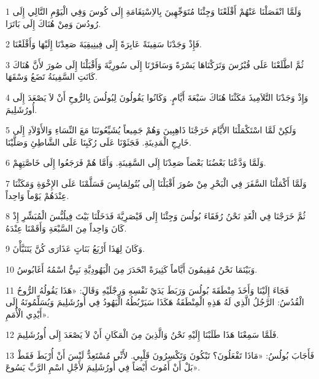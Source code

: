 \par 1 وَلَمَّا انْفَصَلْنَا عَنْهُمْ أَقْلَعْنَا وَجِئْنَا مُتَوَجِّهِينَ بِالاِسْتِقَامَةِ إِلَى كُوسَ وَفِي الْيَوْمِ التَّالِي إِلَى رُودُسَ وَمِنْ هُنَاكَ إِلَى بَاتَرَا.
\par 2 فَإِذْ وَجَدْنَا سَفِينَةً عَابِرَةً إِلَى فِينِيقِيَةَ صَعِدْنَا إِلَيْهَا وَأَقْلَعْنَا.
\par 3 ثُمَّ اطَّلَعْنَا عَلَى قُبْرُسَ وَتَرَكْنَاهَا يَسْرَةً وَسَافَرْنَا إِلَى سُورِيَّةَ وَأَقْبَلْنَا إِلَى صُورَ لأَنَّ هُنَاكَ كَانَتِ السَّفِينَةُ تَضَعُ وَسْقَهَا.
\par 4 وَإِذْ وَجَدْنَا التَّلاَمِيذَ مَكَثْنَا هُنَاكَ سَبْعَةَ أَيَّامٍ. وَكَانُوا يَقُولُونَ لِبُولُسَ بِالرُّوحِ أَنْ لاَ يَصْعَدَ إِلَى أُورُشَلِيمَ.
\par 5 وَلَكِنْ لَمَّا اسْتَكْمَلْنَا الأَيَّامَ خَرَجْنَا ذَاهِبِينَ وَهُمْ جَمِيعاً يُشَيِّعُونَنَا مَعَ النِّسَاءِ وَالأَوْلاَدِ إِلَى خَارِجِ الْمَدِينَةِ. فَجَثَوْنَا عَلَى رُكَبِنَا عَلَى الشَّاطِئِ وَصَلَّيْنَا.
\par 6 وَلَمَّا وَدَّعْنَا بَعْضُنَا بَعْضاً صَعِدْنَا إِلَى السَّفِينَةِ. وَأَمَّا هُمْ فَرَجَعُوا إِلَى خَاصَّتِهِمْ.
\par 7 وَلَمَّا أَكْمَلْنَا السَّفَرَ فِي الْبَحْرِ مِنْ صُورَ أَقْبَلْنَا إِلَى بُتُولِمَايِسَ فَسَلَّمْنَا عَلَى الإِخْوَةِ وَمَكَثْنَا عِنْدَهُمْ يَوْماً وَاحِداً.
\par 8 ثُمَّ خَرَجْنَا فِي الْغَدِ نَحْنُ رُفَقَاءَ بُولُسَ وَجِئْنَا إِلَى قَيْصَرِيَّةَ فَدَخَلْنَا بَيْتَ فِيلُبُّسَ الْمُبَشِّرِ إِذْ كَانَ وَاحِداً مِنَ السَّبْعَةِ وَأَقَمْنَا عِنْدَهُ.
\par 9 وَكَانَ لِهَذَا أَرْبَعُ بَنَاتٍ عَذَارَى كُنَّ يَتَنَبَّأْنَ.
\par 10 وَبَيْنَمَا نَحْنُ مُقِيمُونَ أَيَّاماً كَثِيرَةً انْحَدَرَ مِنَ الْيَهُودِيَّةِ نَبِيٌّ اسْمُهُ أَغَابُوسُ.
\par 11 فَجَاءَ إِلَيْنَا وَأَخَذَ مِنْطَقَةَ بُولُسَ وَرَبَطَ يَدَيْ نَفْسِهِ وَرِجْلَيْهِ وَقَالَ: «هَذَا يَقُولُهُ الرُّوحُ الْقُدُسُ: الرَّجُلُ الَّذِي لَهُ هَذِهِ الْمِنْطَقَةُ هَكَذَا سَيَرْبُطُهُ الْيَهُودُ فِي أُورُشَلِيمَ وَيُسَلِّمُونَهُ إِلَى أَيْدِي الْأُمَمِ».
\par 12 فَلَمَّا سَمِعْنَا هَذَا طَلَبْنَا إِلَيْهِ نَحْنُ وَالَّذِينَ مِنَ الْمَكَانِ أَنْ لاَ يَصْعَدَ إِلَى أُورُشَلِيمَ.
\par 13 فَأَجَابَ بُولُسُ: «مَاذَا تَفْعَلُونَ؟ تَبْكُونَ وَتَكْسِرُونَ قَلْبِي. لأَنِّي مُسْتَعِدٌّ لَيْسَ أَنْ أُرْبَطَ فَقَطْ بَلْ أَنْ أَمُوتَ أَيْضاً فِي أُورُشَلِيمَ لأَجْلِ اسْمِ الرَّبِّ يَسُوعَ».
